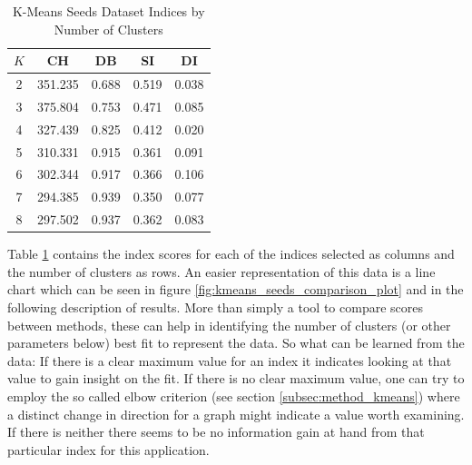 \vspace{-0.5cm}
\begin{table}[H]
\begin{center}
\begin{tabular}{crrrr}
$K$ & \multicolumn{1}{c}{\gls{CH}} & \multicolumn{1}{c}{\gls{DB}} & \multicolumn{1}{c}{\gls{SI}} & \multicolumn{1}{c}{\gls{DI}} \\ \hline
2 & 351.235 & 0.688 & 0.519 & 0.038 \\
3 & 375.804 & 0.753 & 0.471 & 0.085 \\
4 & 327.439 & 0.825 & 0.412 & 0.020 \\
5 & 310.331 & 0.915 & 0.361 & 0.091 \\
6 & 302.344 & 0.917 & 0.366 & 0.106 \\
7 & 294.385 & 0.939 & 0.350 & 0.077 \\
8 & 297.502 & 0.937 & 0.362 & 0.083 \\
\end{tabular}%
\end{center}
\caption{K-Means Seeds Dataset Indices by Number of Clusters}
\label{tab:kmeans_seeds_table}
\end{table}

Table \ref{tab:kmeans_seeds_table} contains the index scores for each of the indices selected as columns and the number of clusters as rows. An easier representation of this data is a line chart which can be seen in figure \ref{fig:kmeans_seeds_comparison_plot} and in the following description of results. More than simply a tool to compare scores between methods, these can help in identifying the number of clusters (or other parameters below) best fit to represent the data. So what can be learned from the data: If there is a clear maximum value for an index it indicates looking at that value to gain insight on the fit. If there is no clear maximum value, one can try to employ the so called elbow criterion (see section \ref{subsec:method_kmeans}) where a distinct change in direction for a graph might indicate a value worth examining. If there is neither there seems to be no information gain at hand from that particular index for this application.

